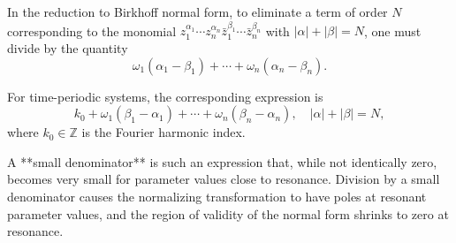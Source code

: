 In the reduction to Birkhoff normal form, to eliminate a term of order $N$ corresponding to the monomial $z_1^{\alpha_1}\cdots z_n^{\alpha_n} \bar{z}_1^{\beta_1}\cdots \bar{z}_n^{\beta_n}$ with $|\alpha| + |\beta| = N$, one must divide by the quantity
$$\omega_1(\alpha_1 - \beta_1) + \cdots + \omega_n(\alpha_n - \beta_n).$$

For time-periodic systems, the corresponding expression is
$$k_0 + \omega_1(\beta_1 - \alpha_1) + \cdots + \omega_n(\beta_n - \alpha_n), \quad |\alpha| + |\beta| = N,$$
where $k_0 \in \mathbb{Z}$ is the Fourier harmonic index.

A **small denominator** is such an expression that, while not identically zero, becomes very small for parameter values close to resonance. Division by a small denominator causes the normalizing transformation to have poles at resonant parameter values, and the region of validity of the normal form shrinks to zero at resonance.
